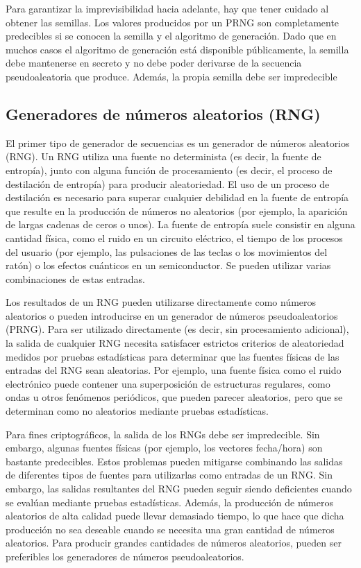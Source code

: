 	Para garantizar la imprevisibilidad hacia adelante, hay que tener cuidado al obtener las semillas. Los valores producidos por un PRNG son completamente predecibles si se conocen la semilla y el algoritmo de generación. Dado que en muchos casos el algoritmo de generación está disponible públicamente, la semilla debe mantenerse en secreto y no debe poder derivarse de la secuencia pseudoaleatoria que produce. Además, la propia semilla debe ser impredecible 
	
	\subsection{Generadores de números aleatorios (RNG)}
	
	El primer tipo de generador de secuencias es un generador de números aleatorios (RNG). Un RNG utiliza una fuente no determinista (es decir, la fuente de entropía), junto con alguna función de procesamiento (es decir, el proceso de destilación de entropía) para producir aleatoriedad. El uso de un proceso de destilación es necesario para superar cualquier debilidad en la fuente de entropía que resulte en la producción de números no aleatorios (por ejemplo, la aparición de largas cadenas de ceros o unos). La fuente de entropía suele consistir en alguna cantidad física, como el ruido en un circuito eléctrico, el tiempo de los procesos del usuario (por ejemplo, las pulsaciones de las teclas o los movimientos del ratón) o los efectos cuánticos en un semiconductor. Se pueden utilizar varias combinaciones de estas entradas.
	
	Los resultados de un RNG pueden utilizarse directamente como números aleatorios o pueden introducirse en un generador de números pseudoaleatorios (PRNG). Para ser utilizado directamente (es decir, sin procesamiento adicional), la salida de cualquier RNG necesita satisfacer estrictos criterios de aleatoriedad medidos por pruebas estadísticas para determinar que las fuentes físicas de las entradas del RNG sean aleatorias. Por ejemplo, una fuente física como el ruido electrónico puede contener una superposición de estructuras regulares, como ondas u otros fenómenos periódicos, que pueden parecer aleatorios, pero que se determinan como no aleatorios mediante pruebas estadísticas.
	
	Para fines criptográficos, la salida de los RNGs debe ser impredecible. Sin embargo, algunas fuentes físicas (por ejemplo, los vectores fecha/hora) son bastante predecibles. Estos problemas pueden mitigarse combinando las salidas de diferentes tipos de fuentes para utilizarlas como entradas de un RNG. Sin embargo, las salidas resultantes del RNG pueden seguir siendo deficientes cuando se evalúan mediante pruebas estadísticas. Además, la producción de números aleatorios de alta calidad puede llevar demasiado tiempo, lo que hace que dicha producción no sea deseable cuando se necesita una gran cantidad de números aleatorios. Para producir grandes cantidades de números aleatorios, pueden ser preferibles los generadores de números pseudoaleatorios.
	
